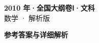 \documentclass[zihao=-4, a4paper]{ctexart}
\begin{document}
\begin{center}
  {\Large\bfseries 2010 年·全国大纲卷Ⅰ·文科}\\[4pt]
  {\large 数学 · 解析版}
\end{center}
\medskip
{}

\clearpage
{}
\begin{center}{\Large\bfseries 参考答案与详细解析}\end{center}
\medskip

\end{document}
